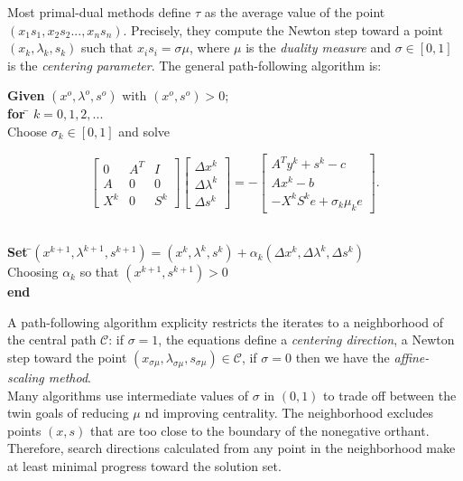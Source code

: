 \documentclass[a4paper,10 pt,titlepage,twoside]{book}
\theoremstyle{plain}
\theoremstyle{definition}
\theoremstyle{remark}
\begin{document}
Most primal-dual methods define $\tau$ as the average value of the point $(x_{1}s_{1},x_{2}s_{2}...,x_{n}s_{n})$. Precisely, they compute the Newton step toward a point $(x_{k}, \lambda_{k},s_{k})$ such that $x_{i}s_{i}=\sigma\mu$, where $\mu$ is the \textit{duality measure} and $\sigma\in[0,1]$ is the \textit{centering parameter}. The general path-following algorithm is:
\begin{tabbing}
\textbf{Given} $(x^{o}, \lambda^{o}, s^{o})$ with $(x^{o}, s^{o})>0$;\\
\textbf{for} \= $k = 0, 1, 2,...$ \\
\> Choose $\sigma_{k}\in[0,1]$ and solve
\end{tabbing}
\begin{equation}\label{(5.8)}
	\begin{bmatrix}\label{P}
	0&A^{T}&I \\A&0&0\\X^{k}&0&S^{k}
	\end{bmatrix}\begin{bmatrix}
	\Delta x^{k}\\\Delta\lambda^{k} \\\Delta s^{k}
	\end{bmatrix}=-\begin{bmatrix}
	A^{T}y^{k}+s^{k}-c\\Ax^{k}-b\\-X^{k}S^{k}e + \sigma_{k}\mu_{k}e
	\end{bmatrix}.
\end{equation}
\begin{tabbing}
	\\
	\textbf{Set} \=$(x^{k+1}, \lambda^{k+1}, s^{k+1}) = (x^{k}, \lambda^{k}, s^{k})+ \alpha_{k}(\Delta x^{k}, \Delta\lambda^{k}, \Delta s^{k})$\\
	\> Choosing $\alpha_{k}$ so that $(x^{k+1}, s^{k+1})>0$ \\
	\textbf{end}
\end{tabbing}
A path-following algorithm explicity restricts the iterates to a neighborhood of the central path $\mathcal{C}$: if $\sigma = 1$, the equations define a \textit{centering direction}, a Newton step toward the point $(x_{\sigma\mu},\lambda_{\sigma\mu}, s_{\sigma\mu})\in\mathcal{C}$, if $\sigma = 0$ then we have the \textit{affine-scaling method}.\\ Many algorithms use intermediate values of $\sigma$ in $(0,1)$ to trade off between the twin goals of reducing $\mu$ nd improving centrality. The neighborhood excludes points $(x, s) $ that are too close to the boundary of the nonegative orthant. Therefore, search directions calculated from any point in the neighborhood make at least minimal progress toward the solution set.
\end{document}

